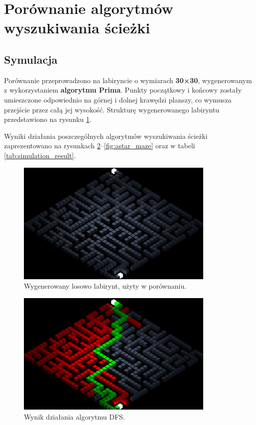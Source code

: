 \documentclass[../doc.tex]{subfiles}
\begin{document}
\section{Porównanie algorytmów wyszukiwania ścieżki}

\subsection{Symulacja}

Porównanie przeprowadzono na labiryncie o wymiarach \textbf{30×30}, wygenerowanym z wykorzystaniem \textbf{algorytmu Prima}. Punkty początkowy i końcowy zostały umieszczone odpowiednio na górnej i dolnej krawędzi planszy, co wymusza przejście przez całą jej wysokość. Strukturę wygenerowanego labiryntu przedstawiono na rysunku \ref{fig:test_maze}. 

Wyniki działania poszczególnych algorytmów wyszukiwania ścieżki zaprezentowano na rysunkach \ref{fig:dfs_maze}–\ref{fig:astar_maze} oraz w tabeli \ref{tab:simulation_result}.

\begin{figure}[H]
    \centering
    \includegraphics[width=0.85\textwidth]{figures/test_maze.png}
    \caption{Wygenerowany losowo labirynt, użyty w porównaniu.}
    \label{fig:test_maze}
\end{figure}

\begin{figure}[H]
    \centering
    \includegraphics[width=0.85\textwidth]{figures/dfs.png}
    \caption{Wynik działania algorytmu DFS.}
    \label{fig:dfs_maze}
\end{figure}
\end{document}
